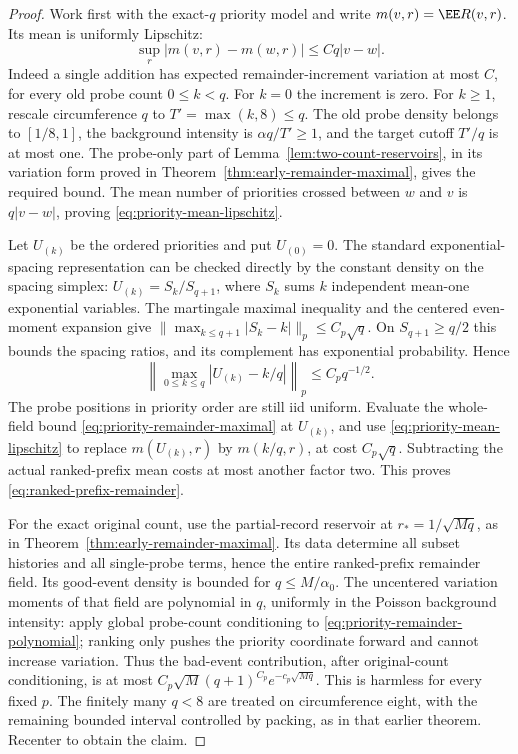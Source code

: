 \documentclass[11pt,letterpaper]{article}
\begin{document}
\begin{proof}
Work first with the exact-$q$ priority model and write
$m(v,r)=\EE R(v,r)$. Its mean is uniformly Lipschitz:
\begin{equation}\label{eq:priority-mean-lipschitz}
 \sup_r|m(v,r)-m(w,r)|\le Cq|v-w|.
\end{equation}
Indeed a single addition has expected remainder-increment
variation at most $C$, for every old probe count $0\le k<q$.
For $k=0$ the increment is zero. For $k\ge1$, rescale
circumference $q$ to $T'=\max(k,8)\le q$.
The old probe density belongs to $[1/8,1]$, the background
intensity is $\alpha q/T'\ge1$, and the target cutoff
$T'/q$ is at most one.
The probe-only part of Lemma~\ref{lem:two-count-reservoirs},
in its variation form proved in
Theorem~\ref{thm:early-remainder-maximal}, gives the required
bound. The mean number of priorities crossed between $w$
and $v$ is $q|v-w|$, proving
\eqref{eq:priority-mean-lipschitz}.

Let $U_{(k)}$ be the ordered priorities and put $U_{(0)}=0$.
The standard exponential-spacing representation can be checked
directly by the constant density on the spacing simplex:
$U_{(k)}=S_k/S_{q+1}$, where $S_k$ sums $k$ independent
mean-one exponential variables. The martingale maximal
inequality and the centered even-moment expansion give
$\|\max_{k\le q+1}|S_k-k|\|_p\le C_p\sqrt q$.
On $S_{q+1}\ge q/2$ this bounds the spacing ratios, and its
complement has exponential probability. Hence
\[
 \left\|\max_{0\le k\le q}|U_{(k)}-k/q|\right\|_p
                                     \le C_pq^{-1/2}.
\]
The probe positions in priority order are still iid uniform.
Evaluate the whole-field bound
\eqref{eq:priority-remainder-maximal} at $U_{(k)}$, and use
\eqref{eq:priority-mean-lipschitz} to replace
$m(U_{(k)},r)$ by $m(k/q,r)$, at cost $C_p\sqrt q$.
Subtracting the actual ranked-prefix mean costs at most
another factor two. This proves
\eqref{eq:ranked-prefix-remainder}.

For the exact original count, use the partial-record
reservoir at $r_*=1/\sqrt{Mq}$, as in
Theorem~\ref{thm:early-remainder-maximal}.
Its data determine all subset histories and all single-probe
terms, hence the entire ranked-prefix remainder field.
Its good-event density is bounded for $q\le M/\alpha_0$.
The uncentered variation moments of that field are polynomial
in $q$, uniformly in the Poisson background intensity:
apply global probe-count conditioning to
\eqref{eq:priority-remainder-polynomial}; ranking only pushes
the priority coordinate forward and cannot increase variation.
Thus the bad-event contribution, after original-count
conditioning, is at most
$C_p\sqrt M(q+1)^{C_p}e^{-c_p\sqrt{Mq}}$.
This is harmless for every fixed $p$.
The finitely many $q<8$ are treated on circumference eight,
with the remaining bounded interval controlled by packing,
as in that earlier theorem. Recenter to obtain the claim.
\end{proof}
\end{document}
